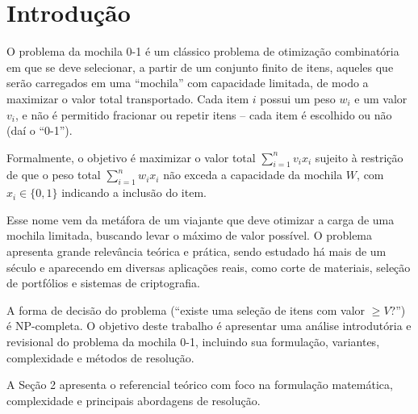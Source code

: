 \section{Introdução}

O problema da mochila 0-1 é um clássico problema de otimização combinatória em que se deve selecionar, a partir de um conjunto finito de itens, aqueles que serão carregados em uma “mochila” com capacidade limitada, de modo a maximizar o valor total transportado. Cada item $i$ possui um peso $w_i$ e um valor $v_i$, e não é permitido fracionar ou repetir itens – cada item é escolhido ou não (daí o “0-1”).

Formalmente, o objetivo é maximizar o valor total $\sum_{i=1}^{n} v_i x_i$ sujeito à restrição de que o peso total $\sum_{i=1}^{n} w_i x_i$ não exceda a capacidade da mochila $W$, com $x_i \in \{0,1\}$ indicando a inclusão do item.

Esse nome vem da metáfora de um viajante que deve otimizar a carga de uma mochila limitada, buscando levar o máximo de valor possível. O problema apresenta grande relevância teórica e prática, sendo estudado há mais de um século e aparecendo em diversas aplicações reais, como corte de materiais, seleção de portfólios e sistemas de criptografia.

A forma de decisão do problema (``existe uma seleção de itens com valor $\geq V$?'') é NP-completa. O objetivo deste trabalho é apresentar uma análise introdutória e revisional do problema da mochila 0-1, incluindo sua formulação, variantes, complexidade e métodos de resolução.

A Seção 2 apresenta o referencial teórico com foco na formulação matemática, complexidade e principais abordagens de resolução.
